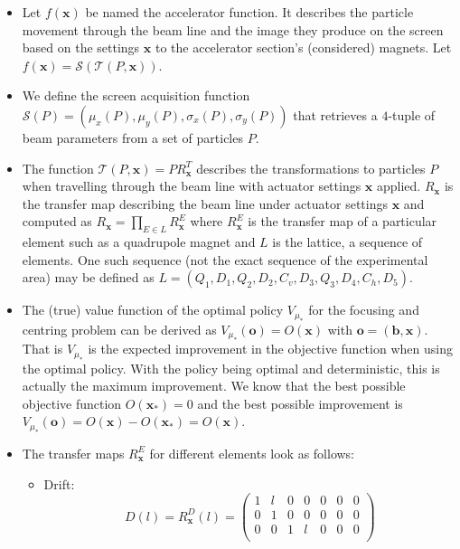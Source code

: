 \begin{itemize}
    \item Let $f(\bm{x})$ be named the accelerator function. It describes the particle movement through the beam line and the image they produce on the screen based on the settings $\bm{x}$ to the accelerator section's (considered) magnets. Let $f(\bm{x}) = \mathcal{S}(\mathcal{T}(P, \bm{x}))$.
    \item We define the screen acquisition function $\mathcal{S}(P) = (\mu_x(P), \mu_y(P), \sigma_x(P), \sigma_y(P))$ that retrieves a $4$-tuple of beam parameters from a set of particles $P$.
    \item The function $\mathcal{T}(P, \bm{x}) = PR_{\bm{x}}^T$ describes the transformations to particles $P$ when travelling through the beam line with actuator settings $\bm{x}$ applied. $R_{\bm{x}}$ is the transfer map describing the beam line under actuator settings $\bm{x}$ and computed as $R_{\bm{x}} = \prod_{E \in L} R_{\bm{x}}^{E}$ where $R_{\bm{x}}^{E}$ is the transfer map of a particular element such as a quadrupole magnet and $L$ is the lattice, a sequence of elements. One such sequence (not the exact sequence of the experimental area) may be defined as $L = (Q_1, D_1, Q_2, D_2, C_v, D_3, Q_3, D_4, C_h, D_5)$.
    \item The (true) value function of the optimal policy $V_{\mu_*}$ for the focusing and centring problem can be derived as $V_{\mu_*}(\bm{o}) = O(\bm{x})$ with $\bm{o} = (\bm{b}, \bm{x})$. That is $V_{\mu_*}$ is the expected improvement in the objective function when using the optimal policy. With the policy being optimal and deterministic, this is actually the maximum improvement. We know that the best possible objective function $O(\bm{x}_*) = 0$ and the best possible improvement is $V_{\mu_*}(\bm{o}) = O(\bm{x}) - O(\bm{x}_*) = O(\bm{x})$.
    \item The transfer maps $R_{\bm{x}}^{E}$ for different elements look as follows:
    \begin{itemize}
        \item Drift:
            \begin{equation*}
                D(l) = R_{\bm{x}}^D(l) = \begin{pmatrix}
                                             1 & l & 0 & 0 & 0 & 0 & 0 \\ %
                                             0 & 1 & 0 & 0 & 0 & 0 & 0 \\ %
                                             0 & 0 & 1 & l & 0 & 0 & 0 \\ %

\end{pmatrix}
\end{equation*}
\end{itemize}
\end{itemize}
